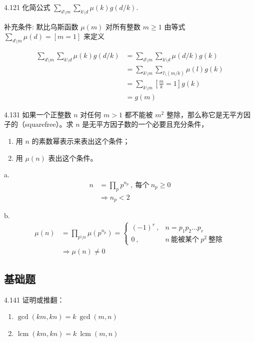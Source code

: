 \begin{problem}{4.12}{1}
  化简公式 \( \sum_{d \setminus m} \sum_{k \setminus d} \mu (k) g(d/k) \).
\end{problem}

补充条件:
默比乌斯函数 \( \mu (m) \) 对所有整数 \( m \ge 1 \) 由等式 \( \sum_{d \setminus m} \mu (d) = [m = 1] \) 来定义

\begin{align*}
  \sum_{d \setminus m} \sum_{k \setminus d} \mu (k) g(d/k) &= \sum_{d \setminus m} \sum_{k \setminus d} \mu (d/k) g(k) \\
  &= \sum_{k \setminus m} \sum_{l \setminus (m/k)} \mu (l) g(k) \\
  &= \sum_{k \setminus m} [\frac{m}{k} = 1] g(k) \\
  &= g(m)
\end{align*}

\begin{problem}{4.13}{1}
  如果一个正整数 \( n \) 对任何 \( m > 1 \) 都不能被 \( m^2 \) 整除，那么称它是无平方因子的（squarefree）。求 \( n \) 是无平方因子数的一个必要且充分条件，
  \begin{enumerate}
    \item[a] 用 \( n \) 的素数幂表示来表出这个条件；
    \item[b] 用 \( \mu (n) \) 表出这个条件。
  \end{enumerate}
\end{problem}

a.
\begin{align*}
  n &= \prod_{p} p^{n_p} \ , \ \text{每个} \ n_p \ge 0 \\
  &\Rightarrow n_p < 2
\end{align*}

b.
\begin{align*}
  \mu (n) &= \prod_{p \setminus n} \mu (p^{n_p}) =
  \begin{cases}
    (-1)^r \ , & n = p_1 p_2 \dots p_r \\
    0 \ , & n \ \text{能被某个} \ p^2 \ \text{整除}
  \end{cases} \\
  &\Rightarrow \mu (n) \neq 0
\end{align*}

\subsection{基础题}

\begin{problem}{4.14}{1}
  证明或推翻：
  \begin{enumerate}
    \item[a] \( \gcd(km, kn) = k \ \gcd(m, n) \)
    \item[b] \( \operatorname{lcm}(km, kn) = k \ \operatorname{lcm}(m, n) \)
  \end{enumerate}
\end{problem}

